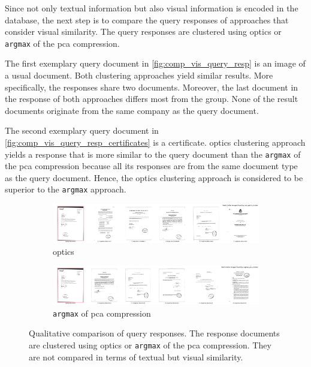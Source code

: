 Since not only textual information but also visual information is encoded in the database, 
the next step is to compare the query responses of approaches that consider visual similarity.
The query responses are clustered using \ac{optics} or \texttt{argmax} of the \ac{pca} compression.

The first exemplary query document in \autoref{fig:comp_vis_query_resp} is an image of a usual document.
Both clustering approaches yield similar results.
More specifically, the responses share two documents.
Moreover, the last document in the response of both approaches differs most from the group.
None of the result documents originate from the same company as the query document.

The second exemplary query document in \autoref{fig:comp_vis_query_resp_certificates} is a certificate.
\ac{optics} clustering approach yields a response that is more similar to the query document than the \texttt{argmax} of the \ac{pca} compression
because all its responses are from the same document type as the query document.
Hence, the \ac{optics} clustering approach is considered to be superior to the \texttt{argmax} approach.

\begin{figure}[h!]
    \begin{subfigure}{\textwidth}
        \centering
        \includegraphics[width=1\textwidth]{images/query_results/d5b16dcfc7c090c1c0ea7503d3fce417a84aa429a078478fdb4291805fee1328/Most_similar_images_found_by_pca_optics_cluster.pdf}
        \caption{\ac{optics}}
        \label{fig:bad_query_resp_tfidf}
    \end{subfigure}

    \begin{subfigure}{\textwidth}
        \centering
        \includegraphics[width=1\textwidth]{images/query_results/d5b16dcfc7c090c1c0ea7503d3fce417a84aa429a078478fdb4291805fee1328/Most_similar_images_found_by_argmax_pca_cluster.pdf}
        \caption{\texttt{argmax} of \ac{pca} compression}
        \label{fig:good_query_resp_sbert}
    \end{subfigure}

\caption[Qualitative comparison of clustering on visual information]{Qualitative comparison of query responses.
The response documents are clustered using \ac{optics} or \texttt{argmax} of the \ac{pca} compression.
They are not compared in terms of textual but visual similarity.
}
\label{fig:comp_vis_query_resp}
\end{figure}

